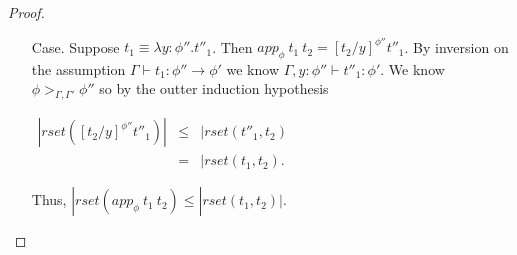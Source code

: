 \begin{proof}
\begin{itemize}
\begin{itemize}
  \item[Case.] Suppose $t_1 \equiv \lambda y:\phi''.t''_1$.  Then $app_\phi\ t_1\ t_2 = [t_2/y]^{\phi''} t''_1$.
    By inversion on the assumption $\Gamma \vdash t_1:\phi'' \to \phi'$ we know $\Gamma,y:\phi'' \vdash t''_1:\phi'$.  
    We know $\phi >_{\Gamma,\Gamma'} \phi''$ so by the outter induction hypothesis 
    \begin{center}
      \begin{math}
        \begin{array}{lll}
          |rset([t_2/y]^{\phi''} t''_1)| & \leq & |rset(t''_1,t_2)\\
          & =    & |rset(t_1,t_2).
        \end{array}
      \end{math}
    \end{center}
    Thus, $|rset(app_\phi\ t_1\ t_2) \leq |rset(t_1,t_2)|$.
    

\end{itemize}
\end{itemize}
\end{proof}
